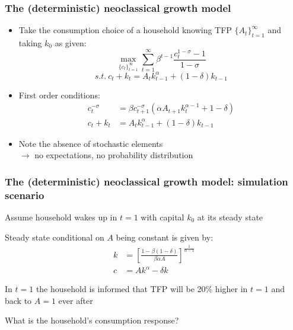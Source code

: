 \documentclass[handout,usepdftitle=false,xcolor=dvipsnames,aspectratio=169]{beamer}
\begin{document}
\begin{frame}
  \frametitle{The (deterministic) neoclassical growth model}
  \begin{itemize}
    \item Take the consumption choice of a household knowing TFP $\{A_t\}_{t=1}^\infty$ and taking $k_0$ as given:
          \begin{equation}
            \max_{\{c_t\}_{t=1}^\infty}\sum_{t=1}^\infty \beta^{t-1}\frac{c_t^{1-\sigma}-1}{1-\sigma}
          \end{equation}
          \begin{equation}
            s.t.\ c_t+k_t = A_t k_{t-1}^\alpha + (1-\delta)k_{t-1}
          \end{equation}
    \item  First order conditions:
          \begin{align}
            c_t^{-\sigma} & = \beta c_{t+1}^{-\sigma}\left(\alpha A_{t+1}k_t^{\alpha-1}+1-\delta\right) \\
            c_t+k_t       & = A_t k_{t-1}^\alpha + (1-\delta)k_{t-1}
          \end{align}
    \item Note the absence of stochastic elements\\
          $\rightarrow$ no expectations, no probability distribution
  \end{itemize}
\end{frame}

\begin{frame}
  \frametitle{The (deterministic) neoclassical growth model: simulation scenario}
  \begin{witemize}
    \item Assume household wakes up in $t=1$ with capital $k_0$ at its steady state
    \item Steady state conditional on $A$ being constant is given by:
    \begin{align}
      k & = \left[\frac{1-\beta(1-\delta)}{\beta\alpha A}\right]^{\frac{1}{\alpha-1}} \\
      c & = A k^\alpha -\delta k
    \end{align}
    \item In $t=1$ the household is informed that TFP will be 20\% higher in $t=1$ and back to $A=1$ ever after
    \item What is the household's consumption response?
  \end{witemize}

\end{frame}
\end{document}
